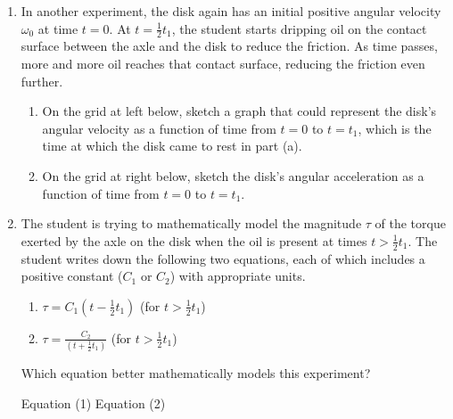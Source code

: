 \documentclass{../../../oss-apphys}
\begin{document}
\begin{enumerate}[leftmargin=15pt]
\begin{enumerate}[leftmargin=15pt]
  \item In another experiment, the disk again has an initial positive angular
    velocity $\omega_0$ at time $t=0$. At $\displaystyle t=\frac12t_1$, the
    student starts dripping oil on the contact surface between the axle and the
    disk to reduce the friction. As time passes, more and more oil reaches that
    contact surface, reducing the friction even further.
     \begin{enumerate}[leftmargin=15pt]
     \item On the grid at left below, sketch a graph that could represent the
       disk's angular velocity as a function of time from $t=0$ to $t=t_1$,
       which is the time at which the disk came to rest in part (a).
     \item On the grid at right below, sketch the disk's angular acceleration
       as a function of time from $t=0$ to $t=t_1$.
     \end{enumerate}
     \begin{center}
     \end{center}
   \item The student is trying to mathematically model the magnitude $\tau$ of
     the torque exerted by the axle on the disk when the oil is present at
     times $\displaystyle t>\frac12t_1$. The student writes down the following
     two equations, each of which includes a positive constant ($C_1$ or $C_2$)
     with appropriate units.
     \begin{enumerate}[label={(\arabic*)},leftmargin=15pt]
     \item$\displaystyle\tau=C_1\left(t-\frac12t_1\right)$ (for $t>\frac12 t_1$)
     \item$\displaystyle\tau=\frac{C_2}{\left(t+\frac12t_1\right)}$ (for
       $t>\frac12t_1$)
     \end{enumerate}
     Which equation better mathematically models this experiment?

     \vspace{.1in}
     \underline{\hspace{.3in}}Equation (1)\hspace{.2in}
     \underline{\hspace{.3in}}Equation (2)
     

\end{enumerate}
\end{enumerate}
\end{document}
